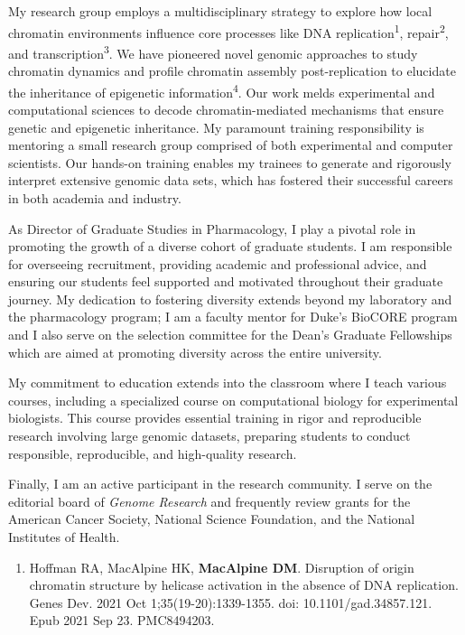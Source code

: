 \begin{statement}
My research group employs a multidisciplinary strategy to explore how local chromatin environments influence core processes like DNA replication\textsuperscript{1}, repair\textsuperscript{2}, and transcription\textsuperscript{3}. We have pioneered novel genomic approaches to study chromatin dynamics and profile chromatin assembly post-replication to elucidate the inheritance of epigenetic information\textsuperscript{4}. Our work melds experimental and computational sciences to decode chromatin-mediated mechanisms that ensure genetic and epigenetic inheritance. My paramount training responsibility is mentoring a small research group comprised of both experimental and computer scientists. Our hands-on training enables my trainees to generate and rigorously interpret extensive genomic data sets, which has fostered their successful careers in both academia and industry.

As Director of Graduate Studies in Pharmacology, I play a pivotal role in promoting the growth of a diverse cohort of graduate students. I am responsible for overseeing recruitment, providing academic and professional advice, and ensuring our students feel supported and motivated throughout their graduate journey. My dedication to fostering diversity extends beyond my laboratory and the pharmacology program; I am a faculty mentor for Duke's  BioCORE program and I also serve on the selection committee for the Dean's Graduate Fellowships which are aimed at promoting diversity across the entire university.  

My commitment to education extends into the classroom where I teach various courses, including a specialized course on computational biology for experimental biologists. This course provides essential training in rigor and reproducible research involving large genomic datasets, preparing students to conduct responsible, reproducible, and high-quality research.

 Finally, I am an active participant in the research community. I serve on the editorial board of \textit{Genome Research} and frequently review grants for the American Cancer Society, National Science Foundation, and the National Institutes of Health.  

\begin{enumerate}

\item Hoffman RA, MacAlpine HK, \textbf{MacAlpine DM}. Disruption of origin chromatin structure by helicase activation in the absence of DNA replication. Genes Dev. 2021 Oct 1;35(19-20):1339-1355. doi: 10.1101/gad.34857.121. Epub 2021 Sep 23. PMC8494203.


\end{enumerate}
\end{statement}
